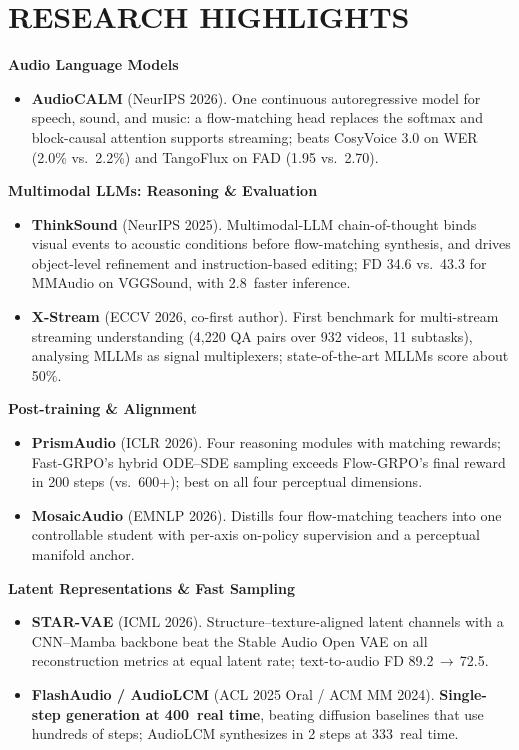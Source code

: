 \documentclass[10pt,letterpaper]{article}
\newcommand{\researchgroup}[1]{\par\vspace{4pt plus 2pt}
  {\color{navy}\sffamily\bfseries\fontsize{10.2}{12.6}\selectfont #1}\par\nobreak}
\begin{document}
\section{RESEARCH HIGHLIGHTS}
\researchgroup{Audio Language Models}
\begin{itemize}
  \item \textbf{AudioCALM} (NeurIPS 2026). One continuous autoregressive model for speech, sound, and music: a flow-matching head replaces the softmax and block-causal attention supports streaming; beats CosyVoice 3.0 on WER (2.0\% vs.\ 2.2\%) and TangoFlux on FAD (1.95 vs.\ 2.70).
\end{itemize}
\researchgroup{Multimodal LLMs: Reasoning \& Evaluation}
\begin{itemize}
  \item \textbf{ThinkSound} (NeurIPS 2025). Multimodal-LLM chain-of-thought binds visual events to acoustic conditions before flow-matching synthesis, and drives object-level refinement and instruction-based editing; FD 34.6 vs.\ 43.3 for MMAudio on VGGSound, with 2.8\texttimes\ faster inference.
  \item \textbf{X-Stream} (ECCV 2026, co-first author). First benchmark for multi-stream streaming understanding (4,220 QA pairs over 932 videos, 11 subtasks), analysing MLLMs as signal multiplexers; state-of-the-art MLLMs score about 50\%.
\end{itemize}
\researchgroup{Post-training \& Alignment}
\begin{itemize}
  \item \textbf{PrismAudio} (ICLR 2026). Four reasoning modules with matching rewards; Fast-GRPO's hybrid ODE--SDE sampling exceeds Flow-GRPO's final reward in 200 steps (vs.\ 600+); best on all four perceptual dimensions.
  \item \textbf{MosaicAudio} (EMNLP 2026). Distills four flow-matching teachers into one controllable student with per-axis on-policy supervision and a perceptual manifold anchor.
\end{itemize}
\researchgroup{Latent Representations \& Fast Sampling}
\begin{itemize}
  \item \textbf{STAR-VAE} (ICML 2026). Structure--texture-aligned latent channels with a CNN--Mamba backbone beat the Stable Audio Open VAE on all reconstruction metrics at equal latent rate; text-to-audio FD 89.2\,$\to$\,72.5.
  \item \textbf{FlashAudio / AudioLCM} (ACL 2025 Oral / ACM MM 2024). \textbf{Single-step generation at 400\texttimes\ real time}, beating diffusion baselines that use hundreds of steps; AudioLCM synthesizes in 2 steps at 333\texttimes\ real time.
\end{itemize}
\end{document}
